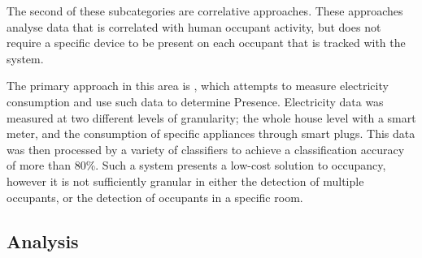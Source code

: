 \documentclass[../thesis/thesis.tex]{subfiles}
\begin{document}
The second of these subcategories are correlative approaches. These approaches analyse data that is correlated with human occupant activity, but does not require a specific device to be present on each occupant that is tracked with the system.

The primary approach in this area is \cite{kleiminger2013occupancy}, which attempts to measure electricity consumption and use such data to determine Presence. Electricity data was measured at two different levels of granularity; the whole house level with a smart meter, and the consumption of specific appliances through smart plugs. This data was then processed by a variety of classifiers to achieve a classification accuracy of more than 80\%. Such a system presents a low-cost solution to occupancy, however it is not sufficiently granular in either the detection of multiple occupants, or the detection of occupants in a specific room.


\subsection{Analysis}
\label{subsec:litreview:sensors:analysis}
\end{document}
